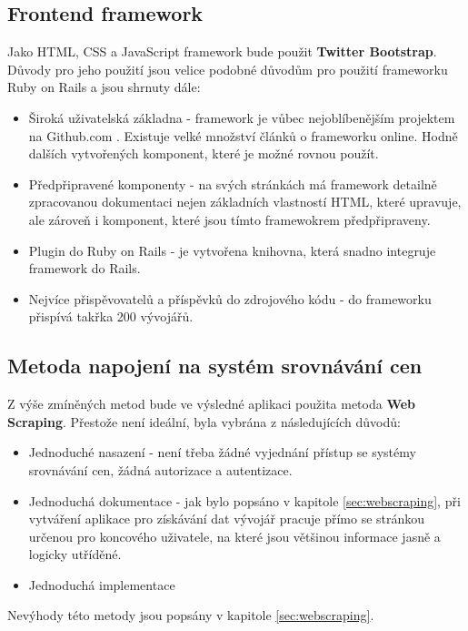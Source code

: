 \subsection{Frontend framework}
Jako HTML, CSS a JavaScript framework bude použit \textbf{Twitter Bootstrap}. Důvody pro jeho použití jsou velice podobné důvodům pro použití frameworku Ruby on Rails a jsou shrnuty dále:
\begin{itemize}
\item Široká uživatelská základna - framework je vůbec nejoblíbenějším projektem na Github.com \cite{website:github-popular}. Existuje velké množství článků o frameworku online. Hodně dalších vytvořených komponent, které je možné rovnou použít.
\item Předpřipravené komponenty - na svých stránkách má framework detailně zpracovanou dokumentaci nejen základních vlastností HTML, které upravuje, ale zároveň i komponent, které jsou tímto framewokrem předpřipraveny.
\item Plugin do Ruby on Rails - je vytvořena knihovna, která snadno integruje framework do Rails\cite{website:github-bootstrap-saas}.
\item Nejvíce přispěvovatelů a příspěvků do zdrojového kódu - do frameworku přispívá takřka 200 vývojářů.
\end{itemize}

\subsection{Metoda napojení na systém srovnávání cen}
Z výše zmíněných metod bude ve výsledné aplikaci použita metoda \textbf{Web Scraping}. Přestože není ideální, byla vybrána z následujících důvodů:
\begin{itemize}
\item Jednoduché nasazení - není třeba žádné vyjednání přístup se systémy srovnávání cen, žádná autorizace a autentizace.
\item Jednoduchá dokumentace - jak bylo popsáno v kapitole \ref{sec:webscraping}, při vytváření aplikace pro získávání dat vývojář pracuje přímo se stránkou určenou pro koncového uživatele, na které jsou většinou informace jasně a logicky utříděné.
\item Jednoduchá implementace
\end{itemize}
Nevýhody této metody jsou popsány v kapitole \ref{sec:webscraping}.
